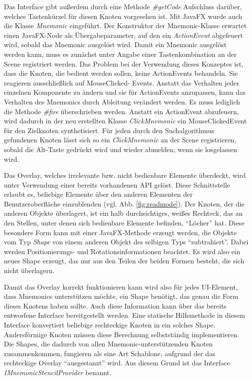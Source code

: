 Das Interface gibt außerdem durch eine Methode \textit{\#{}getCode} Aufschluss darüber, welches Tastenkürzel für diesen Knoten vorgesehen ist. Mit JavaFX wurde auch die Klasse \textit{Mnemonic} eingeführt. Der Konstruktor der Mnemonic-Klasse erwartet einen JavaFX-Node als Übergabeparameter, auf den ein \textit{ActionEvent} abgefeuert wird, sobald das Mnemonic ausgelöst wird. Damit ein Mnemonic ausgelöst werden kann, muss es zunächst unter Angabe einer Tastenkombination an der Scene registriert werden. Das Problem bei der Verwendung dieses Konzeptes ist, dass die Knoten, die bedient werden sollen, keine ActionEvents behandeln. Sie reagieren ausschließlich auf MouseClicked- Events. Anstatt das Verhalten jeder einzelnen Komponente zu ändern und sie für ActionEvents anzupassen, kann das Verhalten des Mnemonics durch Ableitung verändert werden. Es muss lediglich die Methode \textit{\#{}fire} überschrieben werden. Anstatt ein ActionEvent abzufeuern, wird dadurch in der neu erstellten Klasse \textit{ClickMnemonic} ein MouseClickedEvent für den Zielknoten synthetisiert. Für jeden durch den Suchalgorithmus gefundenen Knoten lässt sich so ein \textit{ClickMnemonic} an der Scene registrieren, sobald die Alt-Taste gedrückt wird und wieder abmelden, wenn sie losgelassen wird.\par
Das Overlay, welches irrelevante bzw. nicht bedienbare Elemente überdeckt, wird unter Verwendung einer bereits vorhandenen API gelöst. Diese Schnittstelle erlaubt es, beliebige Elemente über den anderen Elementen der Benutzeroberfläche einzublenden (vgl. Abb. \ref{fig:readmode}). Der Knoten, der die anderen Objekte überlagert, ist ein halb durchsichtiges, weißes Rechteck, das an den Stellen, unter denen sich bedienbare Elemente befinden, \enquote{Löcher} hat. Diese besondere Form kann mit einer JavaFX-Methode erzeugt werden, die Objekte vom Typ \textit{Shape} von einem anderen Objekt des selbigen Typs \enquote{subtrahiert}. Dabei werden Positionierungs- und Rotationsinformationen beachtet. Es wird also ein neues Shape erzeugt, das nur aus den Teilen der beiden Formen besteht, die sich nicht überlagern.\par
Damit das Overlay korrekt funktionieren kann wird also für jedes UI-Element, dass Mnemonics unterstützen möchte, ein Shape benötigt, das genau die Form dieses Knotens haben sollte. Auch diese Information kann über das bereits entworfene Interface bereitgestellt werden. Eine statische Hilfsmethode in diesem Interface konvertiert beliebige rechteckige Knoten in ein solches Shape. Andersförmige Knoten müssen diese Berechnung selbstständig implementieren. Die Shapes, die dadurch von allen Mnemonic-unterstützenden Knoten zusammenkommen, fungieren als eine Art Schablone, aufgrund der das rechteckige Overlay \enquote{ausgestanzt} wird. Aus diesem Grund ist das Interface \textit{IMnemonicStencilProvider} benannt.\par
